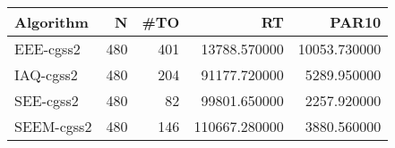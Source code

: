 \begin{tabular}{lrrrr}
\toprule
Algorithm & N & #TO & RT & PAR10 \\
\midrule
EEE-cgss2 & 480 & 401 & 13788.570000 & 10053.730000 \\
IAQ-cgss2 & 480 & 204 & 91177.720000 & 5289.950000 \\
SEE-cgss2 & 480 & 82 & 99801.650000 & 2257.920000 \\
SEEM-cgss2 & 480 & 146 & 110667.280000 & 3880.560000 \\
\bottomrule
\end{tabular}
